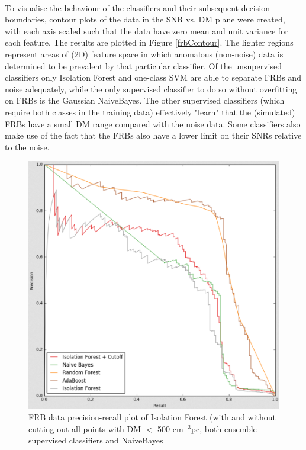 \documentclass[12pt]{article}
\begin{document}
\paragraph{}
To visualise the behaviour of the classifiers and their subsequent decision boundaries, contour plots of the data in the SNR vs. DM plane were created, with each axis scaled such that the data have zero mean and unit variance for each feature. The results are plotted in Figure \ref{frbContour}. The lighter regions represent areas of (2D) feature space in which anomalous (non-noise) data is determined to be prevalent by that particular classifier. Of the unsupervised classifiers only Isolation Forest and one-class SVM are able to separate FRBs and noise adequately, while the only supervised classifier to do so  without overfitting on FRBs is the Gaussian NaiveBayes. The other supervised classifiers (which require both classes in the training data) effectively "learn" that the (simulated) FRBs have a small DM range compared with the noise data. Some classifiers also make use of the fact that the FRBs also have a lower limit on their SNRs relative to the noise.

\begin{figure}[h!]
\begin{center}
\includegraphics[scale=0.4]{prec_recall_cutoff.png}
\caption{FRB data precision-recall plot of Isolation Forest (with and without cutting out all points with DM $<$ 500 cm$^{-3}$pc, both ensemble supervised classifiers and NaiveBayes}
\label{precVsRecCutoff}
\end{center}
\end{figure}
\end{document}
